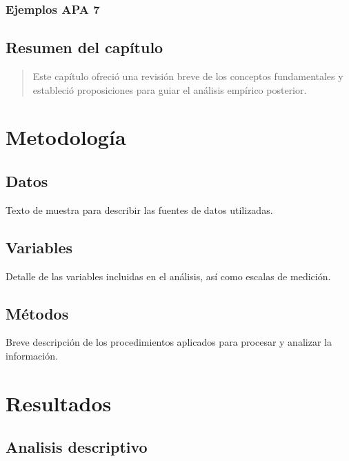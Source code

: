 \documentclass[
  spanish,
  a4paper,
  oneside]{scrbook}
\begin{document}
\subsection{Ejemplos APA 7}\label{ejemplos-apa-7}

\section{Resumen del capítulo}\label{resumen-del-capuxedtulo}

\begin{quote}
Este capítulo ofreció una revisión breve de los conceptos fundamentales
y estableció proposiciones para guiar el análisis empírico posterior.
\end{quote}


\chapter{Metodología}\label{metodologuxeda}

\section{Datos}\label{datos}

Texto de muestra para describir las fuentes de datos utilizadas.

\section{Variables}\label{variables}

Detalle de las variables incluidas en el análisis, así como escalas de
medición.

\section{Métodos}\label{muxe9todos}

Breve descripción de los procedimientos aplicados para procesar y
analizar la información.


\chapter{Resultados}\label{resultados}

\section{Analisis descriptivo}\label{analisis-descriptivo}
\end{document}
